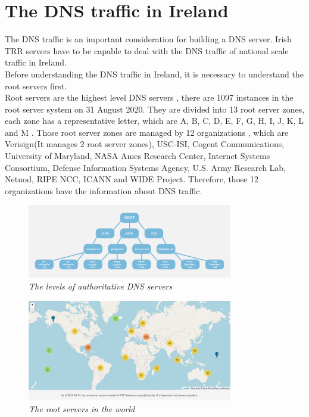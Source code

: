 \chapter{The DNS traffic in Ireland}

The DNS traffic is an important consideration for building a DNS server. Irish TRR servers have to be capable to deal with the DNS traffic of national scale traffic in Ireland.
\\

Before understanding the DNS traffic in Ireland, it is necessary to understand the root servers first.
\\

Root servers are the highest level DNS servers \cite{dns_root_server_cloudflare}, there are 1097 instances in the root server system on 31 August 2020. They are divided into 13 root server zones, each zone has a representative letter, which are A, B, C, D, E, F, G, H, I, J, K, L and M \cite{root_server_wiki}. Those root server zones are managed by 12 organizations \cite{root_servers_org}, which are Verisign(It manages 2 root server zones), USC-ISI, Cogent Communications, University of Maryland, NASA Ames Research Center, Internet Systems Consortium, Defense Information Systems Agency, U.S. Army Research Lab, Netnod, RIPE NCC, ICANN and WIDE Project. Therefore, those 12 organizations have the information about DNS traffic.
\\


\begin{figure}[hbt!]  
    \centering
    \includegraphics[width=0.8\textwidth]{figure/dns-root-server.png}
    \caption{\em The levels of authoritative DNS servers \cite{dns_root_server_cloudflare}}
    \label{fig:levels_authoritative_DNS_servers}
\end{figure}

\begin{figure}[hbt!]  
    \centering
    \includegraphics[width=0.8\textwidth]{figure/root-server-map-big.jpg}
    \caption{\em The root servers in the world \cite{root_servers_org} \label{fig:root_servers_in_the_world}}
\end{figure}

